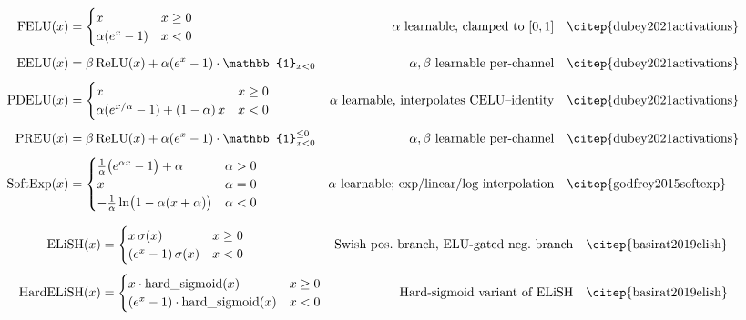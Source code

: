 {\footnotesize
\begin{align}
  \text{FELU}(x) &= \begin{cases} x & x\ge 0 \\ \alpha(e^{x}-1) & x<0 \end{cases}
    & \alpha\text{ learnable, clamped to } [0,1]
    & \quad \text{\citep{dubey2021activations}} \\[4pt]
  \text{EELU}(x) &= \beta\,\text{ReLU}(x)+\alpha(e^{x}-1)\cdot\mathbb{1}_{x<0}
    & \alpha,\beta\text{ learnable per-channel}
    & \quad \text{\citep{dubey2021activations}} \\[4pt]
  \text{PDELU}(x) &= \begin{cases} x & x\ge 0 \\
    \alpha(e^{x/\alpha}-1)+(1-\alpha)\,x & x<0 \end{cases}
    & \alpha\text{ learnable, interpolates CELU--identity}
    & \quad \text{\citep{dubey2021activations}} \\[4pt]
  \text{PREU}(x) &= \beta\,\text{ReLU}(x)+\alpha(e^{x}-1)\cdot\mathbb{1}_{x<0}^{\le 0}
    & \alpha,\beta\text{ learnable per-channel}
    & \quad \text{\citep{dubey2021activations}} \\[4pt]
  \text{SoftExp}(x) &= \begin{cases}
    \tfrac{1}{\alpha}\big(e^{\alpha x}-1\big)+\alpha & \alpha>0 \\
    x & \alpha=0 \\
    -\tfrac{1}{\alpha}\ln\!\big(1-\alpha(x+\alpha)\big) & \alpha<0
    \end{cases}
    & \alpha\text{ learnable; exp/linear/log interpolation}
    & \quad \text{\citep{godfrey2015softexp}}
\end{align}
}  %

{\footnotesize
\begin{align}
  \text{ELiSH}(x) &= \begin{cases} x\,\sigma(x) & x\ge 0 \\
    (e^{x}-1)\,\sigma(x) & x<0 \end{cases}
    & \text{Swish pos.\ branch, ELU-gated neg.\ branch}
    & \quad \text{\citep{basirat2019elish}} \\[4pt]
  \text{HardELiSH}(x) &= \begin{cases} x\cdot\text{hard\_sigmoid}(x) & x\ge 0 \\
    (e^{x}-1)\cdot\text{hard\_sigmoid}(x) & x<0 \end{cases}
    & \text{Hard-sigmoid variant of ELiSH}
    & \quad \text{\citep{basirat2019elish}}
\end{align}
}  %

